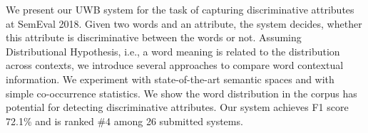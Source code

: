 We present our UWB system for the task of capturing discriminative attributes at SemEval 2018. Given two words and an attribute, the system decides, whether this attribute is discriminative between the words or not. Assuming Distributional Hypothesis, i.e., a word meaning is related to the distribution across contexts, we introduce several approaches to compare word contextual information. We experiment with state-of-the-art semantic spaces and with simple co-occurrence statistics. We show the word distribution in the corpus has potential for detecting discriminative attributes. Our system achieves F1 score 72.1\% and is ranked \#4 among 26 submitted systems.
